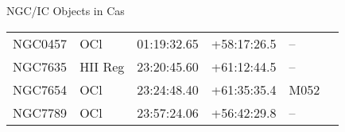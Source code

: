 \begin{block}{NGC/IC Objects in Cas}
  \centering
  \begin{tabularx}{\textwidth}{llrrll} \toprule 
    NGC0457 & OCl & 01:19:32.65 & +58:17:26.5  & -- \\ 
    NGC7635 & HII Reg & 23:20:45.60 & +61:12:44.5  & -- \\ 
    NGC7654 & OCl & 23:24:48.40 & +61:35:35.4  & M052 \\ 
    NGC7789 & OCl & 23:57:24.06 & +56:42:29.8  & -- \\ 
  \end{tabularx}
\end{block}